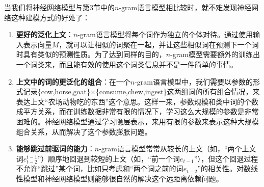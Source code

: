 \documentclass[10pt,a4paper]{ctexart}
\begin{document}
当我们将神经网络模型与第3节中的$n$-gram语言模型相比较时，就不难发现神经网络这种建模方式的好处了：
\begin{enumerate}
\item[] \textbf{更好的泛化上文}：$n$-gram语言模型将每个词作为独立的个体对待。通过使用输入表示向量$M$，就可以让相似的词聚在一起，并让这些相似词在预测下一个词时具有类似的预测性质。为了达到同样的目的，$n$-gram模型需要额外的训练出一个词类来，而且能有效的使用这个词类信息并不是一件简单的事情。
\item[] \textbf{上文中的词的更泛化的组合}：在一个$n$-gram语言模型中，我们需要以参数的形式记录\{cow,horse,goat\}$\times$\{consume,chew,ingest\}这两组词的所有组合情况，来表达上文“农场动物吃的东西”这个意思。这样一来，参数规模和类中词的个数成平方关系，而在训练数据非常有限的情况下，学习这么大规模的参数是非常困难的。神经网络模型通过学习隐层表示，来用有限的参数来表示这种大规模组合关系，从而解决了这个参数膨胀问题。
\item[] \textbf{能够跳过前驱词的能力}：$n$-gram语言模型常常从较长的上文（如，“两个上文词$e_{t-2}^{t-1}$”）顺序地回退到较短的上文（如，“前一个词$e_{t-1}$”），但这个回退过程不允许“跳过”某个词，比如只考虑和“两个词之前的词$e_{t-2}$”的相关性。对数线性模型和神经网络模型则能够很自然的解决这个远距离依赖问题。
\end{enumerate}
\end{document}
